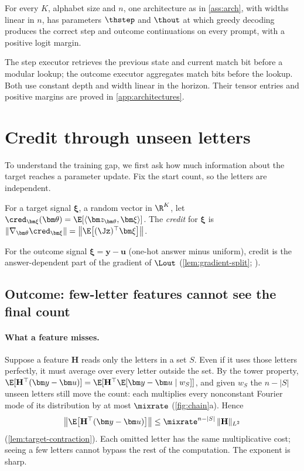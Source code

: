 \begin{proposition}
\label{prop:represent}
For every $K$, alphabet size and $n$, one architecture as in \cref{ass:arch}, with widths linear in $n$, has parameters
$\thstep$ and $\thout$ at which greedy decoding produces the correct step and outcome continuations on every prompt, with
a positive logit margin.
\end{proposition}

The step executor retrieves the previous state and current match bit before a modular lookup;
the outcome executor aggregates match bits before the lookup. Both use constant depth and width
linear in the horizon. Their tensor entries and positive margins are proved in \cref{app:architectures}.

\section{Credit through unseen letters}
\label{sec:credit}

To understand the training gap, we first ask how much information about the target reaches a parameter update.
Fix the start count, so the letters are independent.

\begin{definition}[Credit]
\label{def:credit}
For a target signal $\bm\xi$, a random vector in $\R^K$, let $\cred_{\bm\xi}(\bm\theta)=\E[\langle\bm z_{\bm\theta},\bm\xi\rangle]$. The
\emph{credit} for $\bm\xi$ is $\|\nabla_{\bm\theta}\cred_{\bm\xi}\|=\bigl\|\E\bigl[(\Jz)^\top\bm\xi\bigr]\bigr\|$.
\end{definition}

For the outcome signal $\bm\xi=\bm y-\bm u$ (one-hot answer minus uniform), credit is the answer-dependent part of the gradient of
$\Lout$ (\cref{lem:gradient-split}; \citealp{shalevshwartz2017failures,abbe2025parities}).

\subsection{Outcome: few-letter features cannot see the final count}
\paragraph{What a feature misses.} Suppose a feature $\mathbf H$ reads only the letters in a set $S$. Even if it uses those letters perfectly,
it must average over every letter outside the set. By the tower property,
$\E[\mathbf H^\top(\bm y-\bm u)]=\E[\mathbf H^\top\E[\bm y-\bm u\mid w_S]]$, and given $w_S$ the $n-|S|$ unseen letters still move the count: each
multiplies every nonconstant Fourier mode of its distribution by at most $\mixrate$ (\cref{fig:chain}a). Hence
\begin{equation}
 \bigl\|\E\bigl[\mathbf H^\top(\bm y-\bm u)\bigr]\bigr\|\le\mixrate^{n-|S|}\,\|\mathbf H\|_{L^2}
 \label{eq:credit-degree}
\end{equation}
(\cref{lem:target-contraction}). Each omitted letter has the same multiplicative cost; seeing a few letters cannot bypass the rest of
the computation. The exponent is sharp.

